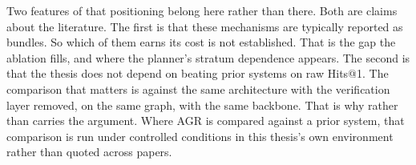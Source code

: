 Two features of that positioning belong here rather than there. Both are claims
about the literature. The first is that these mechanisms are typically reported
as bundles. So which of them earns its cost is not established. That is the gap
the ablation fills, and where the planner's stratum dependence appears. The
second is that the thesis does not depend on beating prior systems on raw
Hits@1. The comparison that matters is against the same architecture with the
verification layer removed, on the same graph, with the same backbone. That is
why  rather than  carries the argument.
Where AGR is compared against a prior system, that comparison is run under
controlled conditions in this thesis's own environment rather than quoted across
papers.

\endinput
